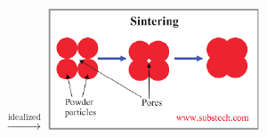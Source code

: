 \documentclass[11pt]{beamer} %
\begin{document}
\begin{frame}
\begin{center}
\begin{columns}
\begin{tikzpicture}
 \end{tikzpicture}
 \centering
 $\xrightarrow{\text{idealized}}$
 \centering
 \includegraphics[width=\textwidth]{figures/sinter_2-crop.pdf}
 \end{columns}
\end{center}
\end{frame}

\end{document}
